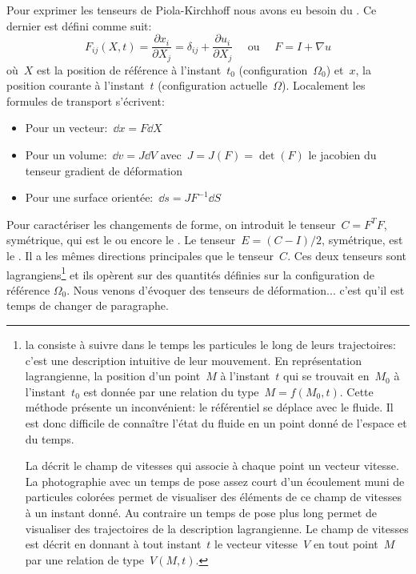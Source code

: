 \medskipvm
Pour exprimer les tenseurs de Piola-Kirchhoff nous avons eu besoin du . Ce dernier est défini comme suit: 
\begin{equation} F_{ij}(X,t) = \dfrac{\partial x_i}{\partial X_j} = \delta_{ij} + \frac{\partial u_i}{\partial X_j}
\quad \text{ ou } \quad F = I + \nabla u\end{equation}
où~$X$ est la position de référence à l'instant~$t_0$ (configuration~$\Omega_0$) et~$x$, la position courante à l'instant~$t$ (configuration actuelle~$\Omega$).
\medskipvm
Localement les formules de transport s'écrivent:
\begin{itemize}
  \item Pour un vecteur:~$\dd x = F \dd X$
  \item Pour un volume:~$\dd v = J \dd V$ avec~$J= J(F) = \det(F)$ le jacobien du tenseur gradient de déformation
  \item Pour une surface orientée:~$\dd s = J F^{-1} \dd S$
\end{itemize}
\medskipvm
Pour caractériser les changements de forme, on introduit le tenseur~$C = F^TF$, symétrique, qui est le  ou encore le .
\medskipvm
Le tenseur~$E = (C-I)/2$, symétrique, est le . Il a les mêmes directions principales que le tenseur~$C$.
\medskipvm
Ces deux tenseurs sont lagrangiens\footnote{la  consiste à suivre dans le temps les particules le long de leurs trajectoires: c'est une description intuitive de leur mouvement.
En représentation lagrangienne, la position d'un point~$M$ à l'instant~$t$ qui se trouvait en~$M_0$ à l'instant~$t_0$ est donnée par une relation du type~$M = f(M_0,t)$. Cette méthode présente un inconvénient: le référentiel se déplace avec le fluide. Il est donc difficile de connaître l'état du fluide en un point donné de l'espace et du temps.

\medskip
La  décrit le champ de vitesses qui associe à chaque point un vecteur vitesse. La photographie avec un temps de pose assez court d'un écoulement muni de particules colorées permet de visualiser des éléments de ce champ de vitesses à un instant donné. Au contraire un temps de pose plus long permet de visualiser des trajectoires de la description lagrangienne. Le champ de vitesses est décrit en donnant à tout instant~$t$ le vecteur vitesse~$V$ en tout point~$M$ par une relation de type~$V(M,t)$.} et ils opèrent sur des quantités définies sur la configuration de référence $\Omega_0$.
\medskipvm
Nous venons d'évoquer des tenseurs de déformation... c'est qu'il est temps de changer de paragraphe.


